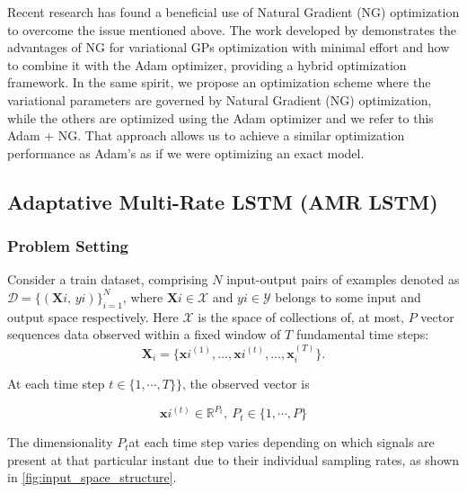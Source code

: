Recent research has found a beneficial use of Natural Gradient (NG) optimization to overcome the issue mentioned above. The work developed by \cite{pmlr-v84-salimbeni18a} demonstrates the advantages of NG for variational GPs optimization with minimal effort and how to combine it with the Adam optimizer, providing a hybrid optimization framework. In the same spirit, we propose an optimization scheme where the variational parameters are governed by Natural Gradient (NG) optimization, while the others are optimized using the Adam optimizer and we refer to this Adam + NG. That approach allows us to achieve a similar optimization performance as Adam's as if we were optimizing an exact model.


\subsection{Adaptative Multi-Rate LSTM (AMR LSTM)}

\subsubsection{Problem Setting}

Consider a train dataset, comprising \(N\) input-output pairs of examples denoted as  $\mathcal{D} = \{(\boldsymbol{X}{i},\,y{i})\}_{i=1}^N$, where 
$\boldsymbol{X}{i}\in\mathcal{X}$ and $y{i}\in\mathcal{Y}$ belongs to some input and output space respectively. Here $\mathcal{X}$ is the space of collections of, at most, \(P\) vector sequences data observed within a fixed window of \(T\) fundamental time steps:
\[
\boldsymbol{X}_i
= \bigl\{\boldsymbol{x}{i}^{(1)}, \dots, \boldsymbol{x}{i}^{(t)}, \dots,\boldsymbol{x}_{i}^{(T)}\bigr\}.
\]

At each time step \(t \in \{1, \cdots, T\}\}\), the observed vector is

\[
\boldsymbol{x}{i}^{(t)} \in \mathbb{R}^{P_t},~P_t \in \{1, \cdots, P\}
\]

The dimensionality \(P_t\)​ at each time step varies depending on which signals are present at that particular instant due to their individual sampling rates, as shown in \cref{fig:input_space_structure}.

